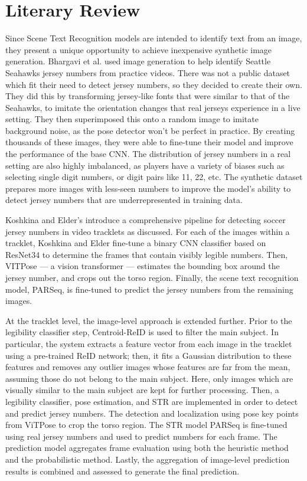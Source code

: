 \documentclass[11pt, letterpaper]{article}
\begin{document}
\section{Literary Review}

Since Scene Text Recognition models are intended to identify text from an image, they present a unique opportunity to achieve inexpensive synthetic image generation. Bhargavi et al. \cite{bhargavi} used image generation to help identify Seattle Seahawks jersey numbers from practice videos. There was not a public dataset which fit their need to detect jersey numbers, so they decided to create their own. They did this by transforming jersey-like fonts that were similar to that of the Seahawks, to imitate the orientation changes that real jerseys experience in a live setting. They then superimposed this onto a random image to imitate background noise, as the pose detector won't be perfect in practice. By creating thousands of these images, they were able to fine-tune their model and improve the performance of the base CNN. The distribution of jersey numbers in a real setting are also highly imbalanced, as players have a variety of biases such as selecting single digit numbers, or digit pairs like 11, 22, etc. The synthetic dataset prepares more images with less-seen numbers to improve the model's ability to detect jersey numbers that are underrepresented in training data.

Koshkina and Elder's \cite{main_paper} introduce a comprehensive pipeline for detecting soccer jersey numbers in video tracklets as discussed. For each of the images within a tracklet, Koshkina and Elder fine-tune a binary CNN classifier based on ResNet34 to determine the frames that contain visibly legible numbers. Then, VITPose — a vision transformer — estimates the bounding box around the jersey number, and crops out the torso region. Finally, the scene text recognition model, PARSeq, is fine-tuned to predict the jersey numbers from the remaining images.

At the tracklet level, the image-level approach is extended further. Prior to the legibility classifier step, Centroid-ReID is used to filter the main subject. In particular, the system extracts a feature vector from each image in the tracklet using a pre-trained ReID network; then, it fits a Gaussian distribution to these features and removes any outlier images whose features are far from the mean, assuming those do not belong to the main subject. Here, only images which are visually similar to the main subject are kept for further processing. Then, a legibility classifier, pose estimation, and STR are implemented in order to detect and predict jersey numbers. The detection and localization using pose key points from ViTPose to crop the torso region. The STR model PARSeq is fine-tuned using real jersey numbers and used to predict numbers for each frame. The prediction model aggregates frame evaluation using both the heuristic method and the probabilistic method. Lastly, the aggregation of image-level prediction results is combined and assessed to generate the final prediction.
\end{document}
